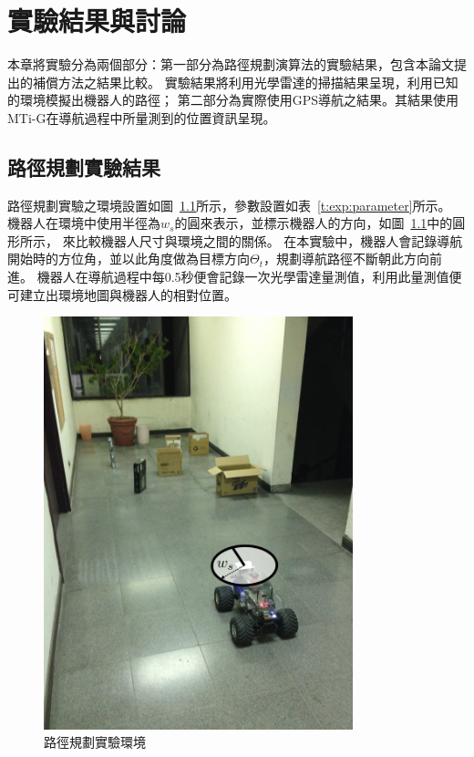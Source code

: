 \chapter{實驗結果與討論}
本章將實驗分為兩個部分：第一部分為路徑規劃演算法的實驗結果，包含本論文提出的補償方法之結果比較。
實驗結果將利用光學雷達的掃描結果呈現，利用已知的環境模擬出機器人的路徑；
第二部分為實際使用GPS導航之結果。其結果使用MTi-G在導航過程中所量測到的位置資訊呈現。

\section{路徑規劃實驗結果}
路徑規劃實驗之環境設置如圖~\ref{f:exp:environment}所示，參數設置如表~\ref{t:exp:parameter}所示。
機器人在環境中使用半徑為$w_s$的圓來表示，並標示機器人的方向，如圖~\ref{f:exp:environment}中的圓形所示，
來比較機器人尺寸與環境之間的關係。
在本實驗中，機器人會記錄導航開始時的方位角，並以此角度做為目標方向$\Theta_t$，規劃導航路徑不斷朝此方向前進。
機器人在導航過程中每0.5秒便會記錄一次光學雷達量測值，利用此量測值便可建立出環境地圖與機器人的相對位置。
\begin{figure}[h!]
	\centering
	\includegraphics[width=0.8\textwidth]{figures/experiments/exp_env}
	\caption{路徑規劃實驗環境}
	\label{f:exp:environment}
\end{figure}

